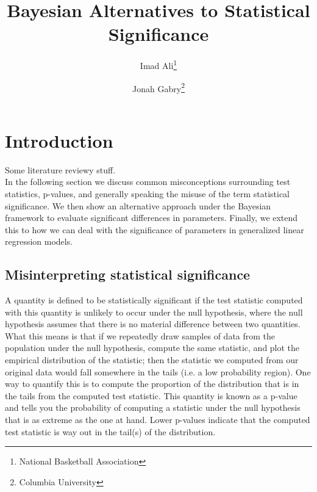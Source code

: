 \documentclass[12pt]{article}
\title{Bayesian Alternatives to Statistical Significance}
\author{Imad Ali\thanks{National Basketball Association} \and Jonah Gabry\thanks{Columbia University}}
\begin{document}
\maketitle
{}
\tableofcontents
\newpage

\def\ci{\perp\!\!\!\perp}
\def\ex{\mathbb{E}}
\def\prob{\mathbb{P}}
\def\ind{\mathbb{I}}
\def\grad{\triangledown}
\def\bigo{\mathcal{O}}

\section{Introduction}

Some literature reviewy stuff. \\

\noindent In the following section we discuss common misconceptions surrounding test statistics, p-values, and generally speaking the misuse of the term statistical significance. We then show an alternative approach under the Bayesian framework to evaluate significant differences in parameters. Finally, we extend this to how we can deal with the significance of parameters in generalized linear regression models. \\

\subsection{Misinterpreting statistical significance}

\noindent A quantity is defined to be statistically significant if the test statistic computed with this quantity is unlikely to occur under the null hypothesis, where the null hypothesis assumes that there is no material difference between two quantities. What this means is that if we repeatedly draw samples of data from the population under the null hypothesis, compute the same statistic, and plot the empirical distribution of the statistic; then the statistic we computed from our original data would fall somewhere in the tails (i.e. a low probability region). One way to quantify this is to compute the proportion of the distribution that is in the tails from the computed test statistic. This quantity is known as a p-value and tells you the probability of computing a statistic under the null hypothesis that is as extreme as the one at hand. Lower p-values indicate that the computed test statistic is way out in the tail(s) of the distribution. \\
\end{document}

